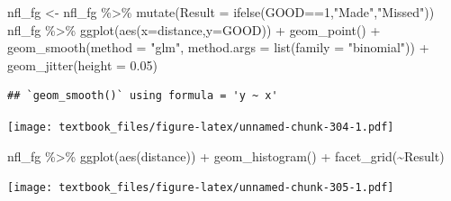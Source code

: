 \documentclass[
  11pt,
]{book}
\newenvironment{Shaded}{\begin{snugshade}}{\end{snugshade}}
\newcommand{\AttributeTok}[1]{\textcolor[rgb]{0.77,0.63,0.00}{#1}}
\newcommand{\DecValTok}[1]{\textcolor[rgb]{0.00,0.00,0.81}{#1}}
\newcommand{\FloatTok}[1]{\textcolor[rgb]{0.00,0.00,0.81}{#1}}
\newcommand{\FunctionTok}[1]{\textcolor[rgb]{0.00,0.00,0.00}{#1}}
\newcommand{\NormalTok}[1]{#1}
\newcommand{\OtherTok}[1]{\textcolor[rgb]{0.56,0.35,0.01}{#1}}
\newcommand{\SpecialCharTok}[1]{\textcolor[rgb]{0.00,0.00,0.00}{#1}}
\newcommand{\StringTok}[1]{\textcolor[rgb]{0.31,0.60,0.02}{#1}}
\theoremstyle{definition}
\theoremstyle{definition}
\theoremstyle{definition}
\theoremstyle{definition}
\theoremstyle{remark}
\begin{document}
\newpage

\begin{Shaded}
\begin{Highlighting}[]
\NormalTok{nfl\_fg }\OtherTok{\textless{}{-}}\NormalTok{ nfl\_fg }\SpecialCharTok{\%\textgreater{}\%} 
  \FunctionTok{mutate}\NormalTok{(}\AttributeTok{Result =} \FunctionTok{ifelse}\NormalTok{(GOOD}\SpecialCharTok{==}\DecValTok{1}\NormalTok{,}\StringTok{"Made"}\NormalTok{,}\StringTok{"Missed"}\NormalTok{))}
\NormalTok{nfl\_fg }\SpecialCharTok{\%\textgreater{}\%} 
  \FunctionTok{ggplot}\NormalTok{(}\FunctionTok{aes}\NormalTok{(}\AttributeTok{x=}\NormalTok{distance,}\AttributeTok{y=}\NormalTok{GOOD)) }\SpecialCharTok{+} 
  \FunctionTok{geom\_point}\NormalTok{() }\SpecialCharTok{+}
  \FunctionTok{geom\_smooth}\NormalTok{(}\AttributeTok{method =} \StringTok{"glm"}\NormalTok{, }
    \AttributeTok{method.args =} \FunctionTok{list}\NormalTok{(}\AttributeTok{family =} \StringTok{"binomial"}\NormalTok{)) }\SpecialCharTok{+}  
  \FunctionTok{geom\_jitter}\NormalTok{(}\AttributeTok{height =} \FloatTok{0.05}\NormalTok{)}
\end{Highlighting}
\end{Shaded}

\begin{verbatim}
## `geom_smooth()` using formula = 'y ~ x'
\end{verbatim}

\texttt{[image: textbook\_files/figure-latex/unnamed-chunk-304-1.pdf]}

\newpage

\begin{Shaded}
\begin{Highlighting}[]
\NormalTok{nfl\_fg }\SpecialCharTok{\%\textgreater{}\%} \FunctionTok{ggplot}\NormalTok{(}\FunctionTok{aes}\NormalTok{(distance)) }\SpecialCharTok{+} \FunctionTok{geom\_histogram}\NormalTok{() }\SpecialCharTok{+} \FunctionTok{facet\_grid}\NormalTok{(}\SpecialCharTok{\textasciitilde{}}\NormalTok{Result)}
\end{Highlighting}
\end{Shaded}

\texttt{[image: textbook\_files/figure-latex/unnamed-chunk-305-1.pdf]}

\newpage
\end{document}
